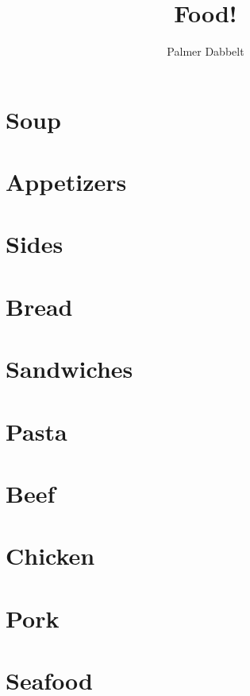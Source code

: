 \documentclass{book}
\author{Palmer Dabbelt}
\title{Food!}
\begin{document}
\maketitle
\tableofcontents
\contentsskip

\newcommand{\maketitle}{}
\renewcommand{\tableofcontents}{}
\newcommand{\author}[1]{}
\newcommand{\title}[1]{}
\renewcommand{\contentsskip}{}
\renewcommand{\bref}[1]{\ref{#1}}

\chapter{Soup}



\chapter{Appetizers}


\chapter{Sides}


\chapter{Bread}



\chapter{Sandwiches}



\chapter{Pasta}






\chapter{Beef}


\chapter{Chicken}






\chapter{Pork}


\chapter{Seafood}

\end{document}
